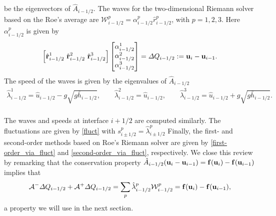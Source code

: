 \documentclass[preprint, 11pt]{article}
\newcommand{\W}{{\mathcal W}}
\newcommand{\A}{{\mathcal A}}
\newcommand{\bff}{{\bf f}}
\newcommand{\bfr}{{\bf r}}
\newcommand{\bfu}{{\bf u}}
\begin{document}
be the eigenvectors of $\hat A_{i-1/2}$.
The waves for the two-dimensional Riemann solver based on the Roe's average are 
$\W_{i-1/2}^p=\alpha_{i-1/2}^p\hat r_{i-1/2}^p$, with $p=1,2,3$. Here $\alpha_{i-1/2}^p$ is given by
\begin{align}\label{system_for_alphas}
  \left[\hat \bfr^1_{i-1/2} ~\hat \bfr^2_{i-1/2} ~\hat \bfr^3_{i-1/2}\right]
  \begin{bmatrix}
    \alpha^1_{i-1/2} \\
    \alpha^2_{i-1/2} \\
    \alpha^3_{i-1/2}
  \end{bmatrix}
  =\Delta Q_{i-1/2}:=\bfu_i-\bfu_{i-1}.
\end{align} 
The speed of the waves is given by the eigenvalues of $\hat A_{i-1/2}$
\begin{align*}
  \hat\lambda_{i-1/2}^1=\hat u_{i-1/2}-g\sqrt{g\bar h_{i-1/2}}, \qquad
  \hat\lambda_{i-1/2}^2=\hat u_{i-1/2}, \qquad
  \hat\lambda_{i-1/2}^3=\hat u_{i-1/2}+g\sqrt{g\bar h_{i-1/2}}. \\
\end{align*}

The waves and speeds at interface $i+1/2$ are computed similarly. 
The fluctuations are given by \eqref{fluct} with $s_{i\pm 1/2}^p=\hat\lambda_{i\pm 1/2}^p$ 
Finally, the first- and second-order methods based on Roe's Riemann solver are given by 
\eqref{first-order_via_fluct} and \eqref{second-order_via_fluct}, respectively. 
We close this review by remarking that the conservation property 
$\hat A_{i-1/2}(\bfu_i-\bfu_{i-1})=\bff(\bfu_i)-\bff(\bfu_{i-1})$ implies that 
\begin{align}\label{cons_roe}
  \A^-\Delta Q_{i-1/2}+\A^+\Delta Q_{i-1/2}=\sum_p \hat\lambda_{i-1/2}^p\W_{i-1/2}^p=\bff(\bfu_{i})-\bff(\bfu_{i-1}),
\end{align}
a property we will use in the next section. 
\end{document}
